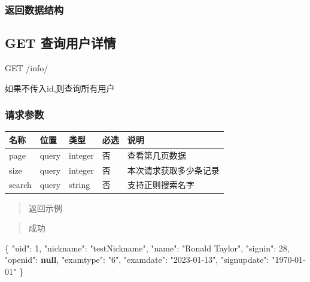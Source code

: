 \documentclass[
]{article}
\newenvironment{Shaded}{}{}
\newcommand{\DataTypeTok}[1]{\textcolor[rgb]{0.56,0.13,0.00}{#1}}
\newcommand{\DecValTok}[1]{\textcolor[rgb]{0.25,0.63,0.44}{#1}}
\newcommand{\FunctionTok}[1]{\textcolor[rgb]{0.02,0.16,0.49}{#1}}
\newcommand{\KeywordTok}[1]{\textcolor[rgb]{0.00,0.44,0.13}{\textbf{#1}}}
\newcommand{\StringTok}[1]{\textcolor[rgb]{0.25,0.44,0.63}{#1}}
\begin{document}
\hypertarget{ux8fd4ux56deux6570ux636eux7ed3ux6784-18}{%
\subsubsection{返回数据结构}\label{ux8fd4ux56deux6570ux636eux7ed3ux6784-18}}

\hypertarget{get-ux67e5ux8be2ux7528ux6237ux8be6ux60c5}{%
\subsection{GET
查询用户详情}\label{get-ux67e5ux8be2ux7528ux6237ux8be6ux60c5}}

GET /info/

如果不传入id,则查询所有用户

\hypertarget{ux8bf7ux6c42ux53c2ux6570-23}{%
\subsubsection{请求参数}\label{ux8bf7ux6c42ux53c2ux6570-23}}

\begin{longtable}[]{@{}lllll@{}}
\toprule
名称 & 位置 & 类型 & 必选 & 说明 \\
\midrule
\endhead
page & query & integer & 否 & 查看第几页数据 \\
size & query & integer & 否 & 本次请求获取多少条记录 \\
search & query & string & 否 & 支持正则搜索名字 \\
\bottomrule
\end{longtable}

\begin{quote}
返回示例
\end{quote}

\begin{quote}
成功
\end{quote}

\begin{Shaded}
\begin{Highlighting}[]
\FunctionTok{\{}
  \DataTypeTok{"uid"}\FunctionTok{:} \DecValTok{1}\FunctionTok{,}
  \DataTypeTok{"nickname"}\FunctionTok{:} \StringTok{"testNickname"}\FunctionTok{,}
  \DataTypeTok{"name"}\FunctionTok{:} \StringTok{"Ronald Taylor"}\FunctionTok{,}
  \DataTypeTok{"signin"}\FunctionTok{:} \DecValTok{28}\FunctionTok{,}
  \DataTypeTok{"openid"}\FunctionTok{:} \KeywordTok{null}\FunctionTok{,}
  \DataTypeTok{"examtype"}\FunctionTok{:} \StringTok{"6"}\FunctionTok{,}
  \DataTypeTok{"examdate"}\FunctionTok{:} \StringTok{"2023{-}01{-}13"}\FunctionTok{,}
  \DataTypeTok{"signupdate"}\FunctionTok{:} \StringTok{"1970{-}01{-}01"}
\FunctionTok{\}}
\end{Highlighting}
\end{Shaded}
\end{document}
